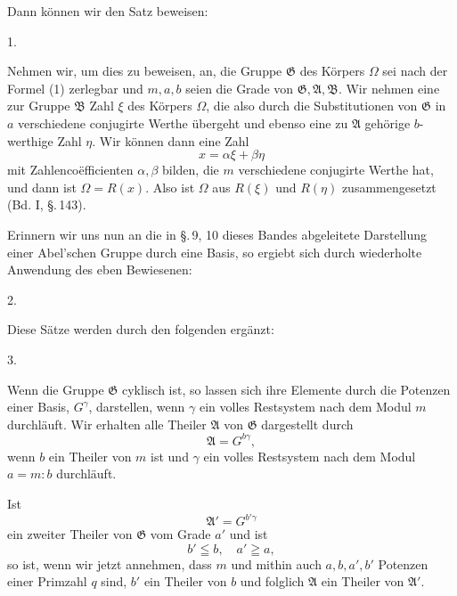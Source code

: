 
Dann können wir den Satz beweisen:

1. 

Nehmen wir, um dies zu beweisen, an, die Gruppe $\mathfrak{G}$ des
Körpers $\Omega$ sei nach der Formel (1) zerlegbar und $m, a, b$
seien die Grade von $\mathfrak{G}, \mathfrak{A}, \mathfrak{B}$. Wir nehmen eine zur Gruppe $\mathfrak{B}$
 Zahl $\xi$ des Körpers $\Omega$, die also durch die Substitutionen
 von $\mathfrak{G}$ in $a$ verschiedene conjugirte Werthe übergeht und
ebenso eine zu $\mathfrak{A}$ gehörige $b$-werthige Zahl $\eta$. Wir können
dann eine Zahl
\[
x = \alpha \xi + \beta \eta
\]
mit  Zahlencoëfficienten $\alpha, \beta$ bilden, die $m$ verschiedene
 conjugirte Werthe hat, und dann ist $\Omega = R(x)$. Also
ist $\Omega$ aus $R(\xi)$ und $R(\eta)$ zusammengesetzt (Bd. I, \S.\,143).

Erinnern wir uns nun an die in \S.\,9, 10 dieses Bandes abgeleitete
 Darstellung einer Abel'schen Gruppe durch eine Basis, so
ergiebt sich durch wiederholte Anwendung des eben Bewiesenen:

2. 

Diese Sätze werden durch den folgenden ergänzt:

3. 

Wenn die Gruppe $\mathfrak{G}$ cyklisch ist, so lassen sich ihre Elemente
 durch die Potenzen einer Basis, $G^\gamma$, darstellen, wenn $\gamma$
ein volles Restsystem nach dem Modul $m$ durchläuft. Wir erhalten
 alle Theiler $\mathfrak{A}$ von $\mathfrak{G}$ dargestellt durch
\[
\mathfrak{A} = G^{b\gamma},
\]
wenn $b$ ein Theiler von $m$ ist und $\gamma$ ein volles Restsystem nach
dem Modul $a = m : b$ durchläuft.

Ist
\[
\mathfrak{A}' = G^{b'\gamma}
\]
ein zweiter Theiler von $\mathfrak{G}$ vom Grade $a'$ und ist
\[
b' \leqq b, \quad a' \geqq a,
\]
so ist, wenn wir jetzt annehmen, dass $m$ und mithin auch
$a, b, a', b'$ Potenzen einer Primzahl $q$ sind, $b'$ ein Theiler von $b$
und folglich $\mathfrak{A}$ ein Theiler von $\mathfrak{A}'$.
